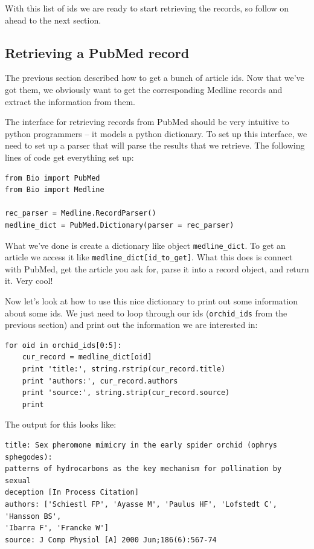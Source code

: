 \documentclass{report}
\begin{document}
With this list of ids we are ready to start retrieving the records, so follow on ahead to the next section.

\subsection{Retrieving a PubMed record}

The previous section described how to get a bunch of article ids. Now that we've got them, we obviously want to get the corresponding Medline records and extract the information from them. 


The interface for retrieving records from PubMed should be very intuitive to python programmers -- it models a python dictionary. To set up this interface, we need to set up a parser that will parse the results that we retrieve. The following lines of code get everything set up:

\begin{verbatim}
from Bio import PubMed
from Bio import Medline

rec_parser = Medline.RecordParser()
medline_dict = PubMed.Dictionary(parser = rec_parser)
\end{verbatim}

What we've done is create a dictionary like object \verb|medline_dict|. To get an article we access it like \verb|medline_dict[id_to_get]|. What this does is connect with PubMed, get the article you ask for, parse it into a record object, and return it. Very cool! 


Now let's look at how to use this nice dictionary to print out some information about some ids. We just need to loop through our ids (\verb|orchid_ids| from the previous section) and print out the information we are interested in:

\begin{verbatim}
for oid in orchid_ids[0:5]:
    cur_record = medline_dict[oid]
    print 'title:', string.rstrip(cur_record.title)
    print 'authors:', cur_record.authors
    print 'source:', string.strip(cur_record.source)
    print
\end{verbatim}

The output for this looks like:

\begin{verbatim}
title: Sex pheromone mimicry in the early spider orchid (ophrys sphegodes):
patterns of hydrocarbons as the key mechanism for pollination by sexual
deception [In Process Citation]
authors: ['Schiestl FP', 'Ayasse M', 'Paulus HF', 'Lofstedt C', 'Hansson BS', 
'Ibarra F', 'Francke W']
source: J Comp Physiol [A] 2000 Jun;186(6):567-74
\end{verbatim}
\end{document}
